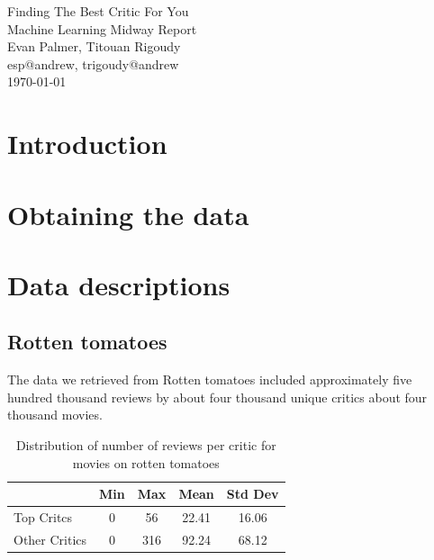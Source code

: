 \documentclass[12pt]{article}
\makeatletter
\newcommand{\myname}{Evan Palmer, Titouan Rigoudy}
\newcommand{\myandrew}{esp@andrew, trigoudy@andrew}
\newcommand{\thedate}{\today}
\makeatother
\begin{document}
	\medskip    
	\thispagestyle{plain}
	\begin{center}                 
	{\LARGE Finding The Best Critic For You} \\
	\medskip
	Machine Learning Midway Report \\
	\smallskip
	\myname \\
	\myandrew \\
	\thedate \\
	\end{center}
	\vspace{0.5cm}

\section{Introduction}


\section{Obtaining the data}



\section{Data descriptions}

\subsection{Rotten tomatoes}

	The data we retrieved from Rotten tomatoes included approximately five hundred thousand reviews by about four thousand unique critics about four thousand movies.


	\begin{table}[H]
	 \centering
	 \caption{Distribution of number of reviews per critic for movies on rotten tomatoes}
	 \begin{tabular}{ l | c | c | c | c }
	 \hline
	 &  Min & Max & Mean & Std Dev  \\
	 \hline
	 Top Critcs & 0 & 56 & 22.41 & 16.06 \\
	 Other Critics & 0 & 316 & 92.24 & 68.12 \\
	 \hline
	 \end{tabular}
	 \end{table}
\end{document}
